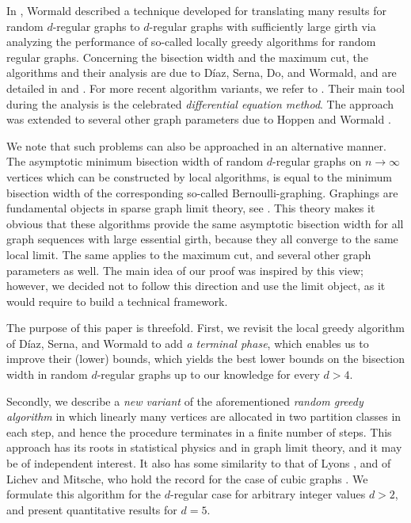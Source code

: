 \documentclass{article}
\theoremstyle{definition}
\begin{document}
In \cite{wormald1999models}, Wormald described a technique developed for translating many results for random $d$-regular graphs to $d$-regular graphs
with sufficiently large girth via analyzing the performance of so-called locally greedy algorithms for random regular graphs. 
Concerning the bisection width and the maximum cut, the algorithms and their analysis are due to Díaz, Serna, Do, and Wormald, and are detailed in \cite{diaz2003bounds} and \cite{diaz2007bounds}. For more recent algorithm variants, we refer to \cite{diaz2024minimum}.
Their main tool during the analysis is the celebrated \textit{differential equation method}. The approach was extended to several other graph parameters due to Hoppen and Wormald \cite{hoppen2018local}.

We note that such problems can also be approached in an alternative manner.
The asymptotic minimum bisection width of random $d$-regular graphs on $n \to \infty$ vertices which can be constructed by local algorithms, is equal to the minimum bisection width of the corresponding so-called Bernoulli-graphing.
Graphings are fundamental objects in sparse graph limit theory, see \cite{hatami2014limits}. 
This theory makes it obvious that these algorithms provide the same asymptotic bisection width for all graph sequences with large essential girth, because they all converge to the same local limit.
The same applies to the maximum cut, and several other graph parameters as well.
The main idea of our proof was inspired by this view; however, we decided not to follow this direction and use the limit object, as it would require to build a technical framework. 

The purpose of this paper is threefold. First, we revisit the local greedy algorithm of Díaz, Serna, and Wormald to add \textit{a terminal phase}, which enables us to improve their (lower) bounds, which yields the best lower bounds on the bisection width in random $d$-regular graphs up to our knowledge for every $d>4$. 

Secondly, we describe a \textit{new variant} of the aforementioned \textit{random greedy algorithm} in which linearly many vertices are allocated in two partition classes in each step, and hence the procedure terminates in a finite number of steps.
This approach has its roots in statistical physics and in graph limit theory, and it may be of independent interest. It also has some similarity to that of Lyons \cite{lyons2017factors}, and of Lichev and Mitsche, who hold the record for the case of cubic graphs \cite{lichev2023minimum}.
We formulate this algorithm for the  $d$-regular case for arbitrary integer values $d>2$, and present quantitative results for $d=5$. 
\end{document}
